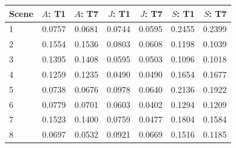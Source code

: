 \begin{inlinetable}
\centering
\caption{Scene-level metrics after 105,000 adaptation iterations (DN), with results for the two offset trajectories averaged within each scene.}\label{tab:sources}
\footnotesize
\setlength{\tabcolsep}{3pt}
\begin{tabular}{lrrrrrr}
\toprule
Scene & $A$: T1 & $A$: T7 & $J$: T1 & $J$: T7 & $S$: T1 & $S$: T7 \\
\midrule
1 & 0.0757 & 0.0681 & 0.0744 & 0.0595 & 0.2455 & 0.2399 \\
2 & 0.1554 & 0.1536 & 0.0803 & 0.0608 & 0.1198 & 0.1039 \\
3 & 0.1395 & 0.1408 & 0.0595 & 0.0503 & 0.1096 & 0.1018 \\
4 & 0.1259 & 0.1235 & 0.0490 & 0.0490 & 0.1654 & 0.1677 \\
5 & 0.0738 & 0.0676 & 0.0978 & 0.0640 & 0.2136 & 0.1922 \\
6 & 0.0779 & 0.0701 & 0.0603 & 0.0402 & 0.1294 & 0.1209 \\
7 & 0.1523 & 0.1400 & 0.0759 & 0.0477 & 0.1804 & 0.1584 \\
8 & 0.0697 & 0.0532 & 0.0921 & 0.0669 & 0.1516 & 0.1185 \\
\bottomrule
\end{tabular}
\end{inlinetable}
